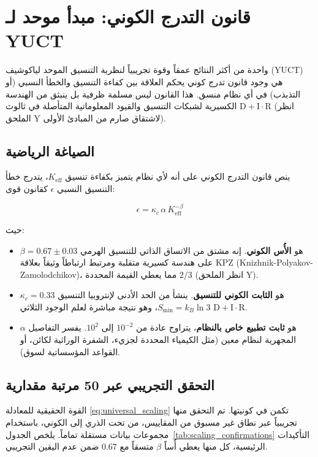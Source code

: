 \documentclass[11pt,a4paper]{article}
\begin{document}
	\section{قانون التدرج الكوني: مبدأ موحد لـ YUCT}
	\label{sec:universal_scaling}
	
	واحدة من أكثر النتائج عمقاً وقوة تجريبياً لنظرية التنسيق الموحد لياكوشيف (YUCT) هي وجود قانون تدرج كوني يحكم العلاقة بين كفاءة التنسيق والخطأ النسبي (أو التذبذب) في أي نظام منسق. هذا القانون ليس مسلمة ظرفية بل ينبثق من الهندسة الكسيرية لشبكات التنسيق والقيود المعلوماتية المتأصلة في ثالوث $\mathrm{D} + \mathrm{I}\cdot \mathrm{R}$ (انظر الملحق Y لاشتقاق صارم من المبادئ الأولى).
	
	\subsection{الصياغة الرياضية}
	
	ينص قانون التدرج الكوني على أنه لأي نظام يتميز بكفاءة تنسيق $K_{\mathrm{eff}}$، يتدرج خطأ التنسيق النسبي $\epsilon$ كقانون قوى:
	
	\begin{equation}
		\boxed{\epsilon = \kappa_c \, \alpha \, K_{\mathrm{eff}}^{-\beta}}
		\label{eq:universal_scaling}
	\end{equation}
	
	حيث:
	\begin{itemize}
		\item $\beta = 0.67 \pm 0.03$ هو \textbf{الأُس الكوني}. إنه مشتق من الاتساق الذاتي للتنسيق الهرمي على هندسة كسيرية متقلبة ومرتبط ارتباطاً وثيقاً بعلاقة KPZ (Knizhnik-Polyakov-Zamolodchikov)، مما يعطي القيمة المحددة $2/3$ (انظر الملحق Y).
		\item $\kappa_c = 0.33$ هو \textbf{الثابت الكوني للتنسيق}. ينشأ من الحد الأدنى لإنتروبيا التنسيق $S_{\mathrm{min}} = k_B \ln 3$، وهو نتيجة مباشرة لعلم الوجود الثلاثي $\mathrm{D}+\mathrm{I}\cdot\mathrm{R}$.
		\item $\alpha$ هو \textbf{ثابت تطبيع خاص بالنظام}، يتراوح عادة من $10^{-2}$ إلى $10^2$. يفسر التفاصيل المجهرية لنظام معين (مثل الكيمياء المحددة لجزيء، الشفرة الوراثية لكائن، أو القواعد المؤسساتية لسوق).
	\end{itemize}
	
	\subsection{التحقق التجريبي عبر 50 مرتبة مقدارية}
	
	القوة الحقيقية للمعادلة \eqref{eq:universal_scaling} تكمن في كونيتها. تم التحقق منها تجريبياً عبر نطاق غير مسبوق من المقاييس، من تحت الذري إلى الكوني، باستخدام مجموعات بيانات مستقلة تماماً. يلخص الجدول~\ref{tab:scaling_confirmations} التأكيدات الرئيسية، كل منها يعطي أُساً $\beta$ متسقاً مع $0.67$ ضمن عدم اليقين التجريبي.
	
\end{document}
